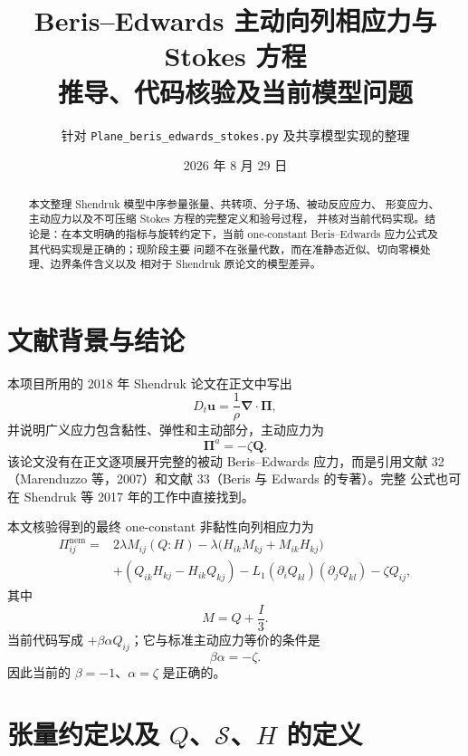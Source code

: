 \documentclass[UTF8,11pt,a4paper]{ctexart}
\title{Beris--Edwards 主动向列相应力与 Stokes 方程\\
推导、代码核验及当前模型问题}
\author{针对 \texttt{Plane\_beris\_edwards\_stokes.py} 及共享模型实现的整理}
\date{2026 年 8 月 29 日}
\newcommand{\piact}{\bm{\Pi}^{a}}
\begin{document}
\maketitle

\begin{abstract}
本文整理 Shendruk 模型中序参量张量、共转项、分子场、被动反应应力、
形变应力、主动应力以及不可压缩 Stokes 方程的完整定义和验号过程，
并核对当前代码实现。结论是：在本文明确的指标与旋转约定下，当前
one-constant Beris--Edwards 应力公式及其代码实现是正确的；现阶段主要
问题不在张量代数，而在准静态近似、切向零模处理、边界条件含义以及
相对于 Shendruk 原论文的模型差异。
\end{abstract}

\tableofcontents

\section{文献背景与结论}

本项目所用的 2018 年 Shendruk 论文在正文中写出
\begin{equation}
  D_t\bm u=\frac{1}{\rho}\bm\nabla\!\cdot\bm\Pi,
\end{equation}
并说明广义应力包含黏性、弹性和主动部分，主动应力为
\begin{equation}
  \piact=-\zeta\bm Q.
\end{equation}
该论文没有在正文逐项展开完整的被动 Beris--Edwards 应力，而是引用文献
32（Marenduzzo 等，2007）和文献 33（Beris 与 Edwards 的专著）。完整
公式也可在 Shendruk 等 2017 年的工作中直接找到。

本文核验得到的最终 one-constant 非黏性向列相应力为
\begin{equation}
\boxed{
\begin{aligned}
\Pi^{\mathrm{nem}}_{ij}={}&
2\lambda M_{ij}(Q:H)
-\lambda\bigl(H_{ik}M_{kj}+M_{ik}H_{kj}\bigr)\\
&+(Q_{ik}H_{kj}-H_{ik}Q_{kj})
-L_1(\partial_iQ_{kl})(\partial_jQ_{kl})
-\zeta Q_{ij},
\end{aligned}}
\label{eq:final-stress}
\end{equation}
其中
\begin{equation}
  M=Q+\frac{I}{3}.
\end{equation}
当前代码写成 $+\beta\alpha Q_{ij}$；它与标准主动应力等价的条件是
\begin{equation}
\boxed{\beta\alpha=-\zeta.}
\end{equation}
因此当前的 $\beta=-1$、$\alpha=\zeta$ 是正确的。

\section{张量约定以及 $Q$、$\mathcal S$、$H$ 的定义}
\end{document}
